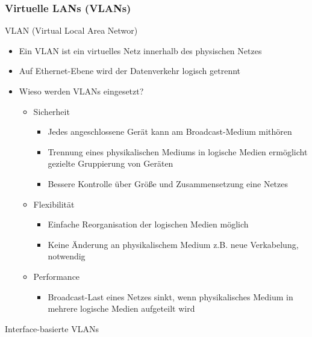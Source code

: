     \subsubsection{Virtuelle LANs (VLANs)}
      VLAN (Virtual Local Area Networ)
      \begin{itemize}
        \item Ein VLAN ist ein virtuelles Netz innerhalb des physischen Netzes
        \item Auf Ethernet-Ebene wird der Datenverkehr logisch getrennt
        \item Wieso werden VLANs eingesetzt?
          \begin{itemize}
            \item Sicherheit
              \begin{itemize}
                \item Jedes angeschlossene Gerät kann am Broadcast-Medium mithören
                \item Trennung eines physikalischen Mediums in logische Medien ermöglicht gezielte
                  Gruppierung von Geräten
                \item Bessere Kontrolle über Größe und Zusammensetzung eine Netzes
              \end{itemize}
            \item Flexibilität
              \begin{itemize}
                \item Einfache Reorganisation der logischen Medien möglich
                \item Keine Änderung an physikalischem Medium z.B. neue Verkabelung, notwendig
              \end{itemize}
            \item Performance
              \begin{itemize}
                \item Broadcast-Last eines Netzes sinkt, wenn physikalisches Medium in mehrere
                  logische Medien aufgeteilt wird
              \end{itemize}
          \end{itemize}
      \end{itemize}
      Interface-basierte VLANs
